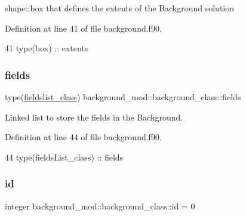 shape\+::box that defines the extents of the Background solution 



Definition at line 41 of file background.\+f90.


\begin{DoxyCode}
41         \textcolor{keywordtype}{type}(box) :: extents
\end{DoxyCode}
\mbox{\label{structbackground__mod_1_1background__class_a68b750f0476dc75b886638a45a45f8f6}} 
\subsubsection{\texorpdfstring{fields}{fields}}
{\footnotesize\ttfamily type(\mbox{\hyperlink{structbackground__mod_1_1fieldslist__class}{fieldslist\+\_\+class}}) background\+\_\+mod\+::background\+\_\+class\+::fields\hspace{0.3cm}{\ttfamily [private]}}



Linked list to store the fields in the Background. 



Definition at line 44 of file background.\+f90.


\begin{DoxyCode}
44         \textcolor{keywordtype}{type}(fieldsList\_class) :: fields
\end{DoxyCode}
\mbox{\label{structbackground__mod_1_1background__class_a1b3eabdda94ffdb97b6bb0db385edfd8}} 
\subsubsection{\texorpdfstring{id}{id}}
{\footnotesize\ttfamily integer background\+\_\+mod\+::background\+\_\+class\+::id = 0\hspace{0.3cm}{\ttfamily [private]}}



